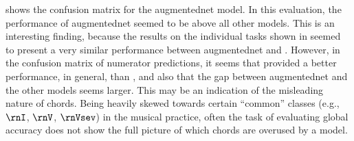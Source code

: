 

 shows the
confusion matrix for the \gls{augmentednet} model. In this
evaluation, the performance of \gls{augmentednet} seemed to
be above all other models. This is an interesting finding,
because the results on the individual tasks shown in
 seemed to present a very similar
performance between \gls{augmentednet} and
\textcite{micchi2021deep}. However, in the confusion matrix
of numerator predictions, it seems that
\textcite{mcleod2021modular} provided a better performance,
in general, than \textcite{micchi2021deep}, and also that
the gap between \gls{augmentednet} and the other models
seems larger. This may be an indication of the misleading
nature of chords. Being heavily skewed towards certain
``common'' classes (e.g., $\rnI$, $\rnV$, $\rnVsev$) in the
musical practice, often the task of evaluating global
accuracy does not show the full picture of which chords are
overused by a model.

